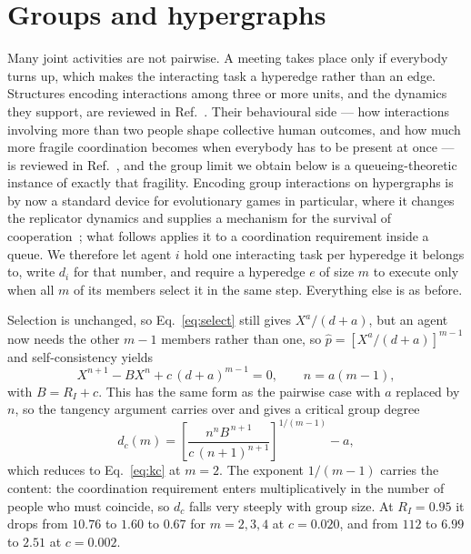 \documentclass[aps,pre,twocolumn,superscriptaddress,floatfix,longbibliography]{revtex4-2}
\begin{document}
\section{Groups and hypergraphs}
\label{sec:groups}

Many joint activities are not pairwise. A meeting takes place only if everybody
turns up, which makes the interacting task a hyperedge rather than an edge.
Structures encoding interactions among three or more units, and the dynamics
they support, are reviewed in Ref.~\cite{battiston2020}. Their behavioural
side --- how interactions involving more than two people shape collective human
outcomes, and how much more fragile coordination becomes when everybody has to be
present at once --- is reviewed in Ref.~\cite{battiston2025}, and the group limit
we obtain below is a queueing-theoretic instance of exactly that fragility. Encoding group
interactions on hypergraphs is by now a standard device for evolutionary games
in particular, where it changes the replicator dynamics and supplies a mechanism
for the survival of cooperation~\cite{alvarez2021,perc2013}; what follows
applies it to a coordination requirement inside a queue. We
therefore let agent $i$ hold one interacting task per hyperedge it belongs to,
write $d_i$ for that number, and require a hyperedge $e$ of size $m$ to execute
only when all $m$ of its members select it in the same step. Everything else is
as before.

Selection is unchanged, so Eq.~\eqref{eq:select} still gives $X^{a}/(d+a)$, but
an agent now needs the other $m-1$ members rather than one, so
$\hat p = [X^{a}/(d+a)]^{m-1}$ and self-consistency yields
\begin{equation}
  X^{n+1}-BX^{n}+c\,(d+a)^{m-1}=0,\qquad n=a(m-1),
  \label{eq:hyper}
\end{equation}
with $B=R_I+c$. This has the same form as the pairwise case with $a$ replaced by
$n$, so the tangency argument carries over and gives a critical group degree
\begin{equation}
  d_c(m)=\left[\frac{n^{n}B^{\,n+1}}{c\,(n+1)^{n+1}}\right]^{1/(m-1)}-a ,
  \label{eq:dc}
\end{equation}
which reduces to Eq.~\eqref{eq:kc} at $m=2$. The exponent $1/(m-1)$ carries the
content: the coordination requirement enters multiplicatively in the number of
people who must coincide, so $d_c$ falls very steeply with group size. At
$R_I=0.95$ it drops from $10.76$ to $1.60$ to $0.67$ for $m=2,3,4$ at $c=0.020$,
and from $112$ to $6.99$ to $2.51$ at $c=0.002$.
\end{document}
